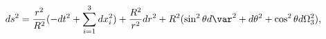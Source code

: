 \begin{equation}
ds^2 = \frac{r^2}{R^2} ( -dt^2 + \sum_{i=1}^{3}dx_i^2 ) + 
\frac{R^2}{r^2}dr^2 + R^2(\sin^2\theta d\var^2 + d\theta^2 
+ \cos^2\theta d\Omega_3^2 ),
\end{equation}

